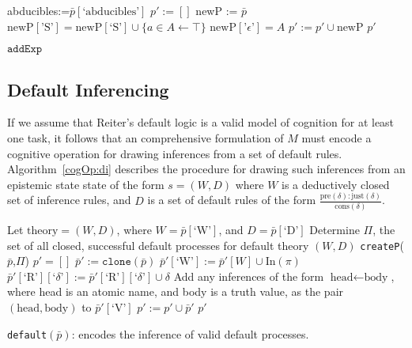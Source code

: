 \begin{algorithm}[H] 
\SetAlgoLined
{}
{
abducibles:=$\bar{p}[\textrm{`abducibles'}]$\;
$p':=[]$\;
{
newP := $\bar{p}$\;
$\text{newP}[\textrm{'S'}]=\text{newP}[\textrm{`S'}] \cup \{a \in A\leftarrow \top\}$\;
$\text{newP}[\textrm{'}\epsilon \textrm{'}]=A$\;
$p':=p' \cup \text{newP}$\;
}
\Return $p'$
}

\caption{$\texttt{addExp}$}
\label{cogOp:addExp}
\end{algorithm}


\subsection{Default Inferencing}
If we assume that Reiter's default logic is a valid model of cognition for at least one task, it follows that an comprehensive formulation of $M$ must encode a cognitive operation for drawing inferences from a set of default rules. Algorithm~\ref{cogOp:di} describes the procedure for drawing such inferences from an epistemic state state of the form $s=(W,D)$ where $W$ is a deductively closed set of inference rules, and $D$ is a set of default rules of the form $\frac{\text{pre}(\delta):\text{just}(\delta)}{\text{cons}(\delta)}$.

\begin{algorithm}[H] 
\SetAlgoLined
{}
{
Let $\textrm{theory}=(W,D)$, where $W=\bar{p}[\text{`W'}]$, and $D=\bar{p}[\textrm{`D'}]$\;
Determine $\Pi$, the set of all closed, successful default processes for default theory $(W,D)$\;
\Return \texttt{createP}($\bar{p}$,$\Pi$)
}
{
$p'=[]$
\For{$\pi \in \Pi$}
{
$\bar{p}':=\texttt{clone}(\bar{p})$\;
$\bar{p}'[\textrm{`W'}]:=\bar{p}'[W]\cup \text{In}(\pi)$\;
$\bar{p}'[\textrm{`R'}][\textrm{`}\delta\textrm{'}]:=\bar{p}'[\textrm{`R'}][\textrm{`}\delta\textrm{'}]\cup \delta$\;
Add any inferences of the form $\text{head}\leftarrow \text{body}$, where head is an atomic name, and body is a truth value, as the pair $(\text{head},\text{body})$ to $\bar{p}'[\textrm{`V'}]$\;
$p':=p'\cup \bar{p}'$\;
\Return $p'$
}
}

\caption{\texttt{default}$(\bar{p})$: encodes the inference of valid default processes.}
\label{cogOp:di}
\end{algorithm}

